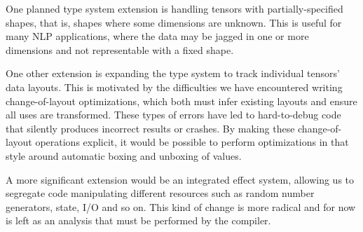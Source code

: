 One planned type system extension is handling tensors with partially-specified shapes,
that is, shapes where some dimensions are unknown. This is useful for many NLP applications,
where the data may be jagged in one or more dimensions and not representable with a fixed shape.

One other extension is expanding the type system to track individual tensors' data layouts.
This is motivated by the difficulties we have encountered writing change-of-layout optimizations,
which both must infer existing layouts and ensure all uses are transformed. These types of errors
have led to hard-to-debug code that silently produces incorrect results or crashes.
By making these change-of-layout operations explicit, it would be possible to perform
optimizations in that style around automatic boxing and unboxing of values.


A more significant extension would be an integrated effect system, allowing us to segregate code
manipulating different resources such as random number generators, state, I/O and so on.
This kind of change is more radical and for now is left as an analysis that must be performed
by the compiler.
